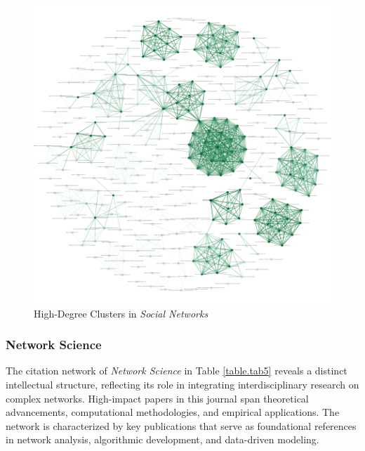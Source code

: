 \documentclass[twocolumn]{article}
\begin{document}
	\begin{figure}[htbp]
		\centering
		\includegraphics[width=\columnwidth]{"Social Networks/Gephi/high_degree.pdf"}
		\caption{High-Degree Clusters in \textit{Social Networks}}
		\label{fig.fig4}
	\end{figure}
	
	\subsubsection*{Network Science}
	
	
	The citation network of \textit{Network Science} in Table \ref{table.tab5} reveals a distinct intellectual structure, reflecting its role in integrating interdisciplinary research on complex networks. High-impact papers in this journal span theoretical advancements, computational methodologies, and empirical applications. The network is characterized by key publications that serve as foundational references in network analysis, algorithmic development, and data-driven modeling.
	
\end{document}
